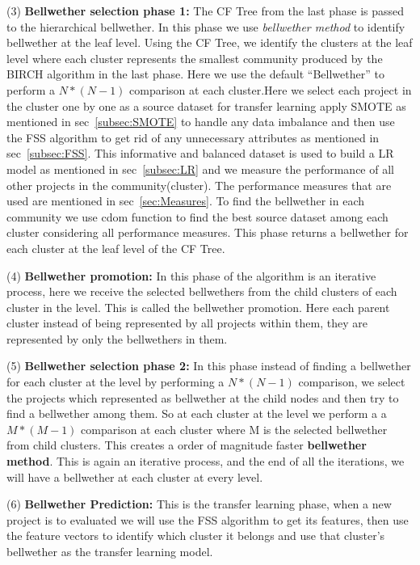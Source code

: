 \documentclass[sigconf,review]{acmart}
\theoremstyle{break}
\begin{document}
    (3) \textbf{Bellwether selection phase 1:} The CF Tree from the last phase is passed to the hierarchical bellwether. In this phase we use \textit{bellwether method} to identify bellwether at the leaf level. Using the CF Tree, we identify the clusters at the leaf level where each cluster represents the smallest community produced by the BIRCH algorithm in the last phase. Here we use the default ``Bellwether'' to perform a $ N*(N-1) $ comparison at each cluster.Here we select each project in the cluster one by one as a source dataset for transfer learning apply SMOTE as mentioned in sec~\ref{subsec:SMOTE} to handle any data imbalance and then use the FSS algorithm to get rid of any unnecessary attributes as mentioned in sec~\ref{subsec:FSS}. This informative and balanced dataset is used to build a LR model as mentioned in sec~\ref{subsec:LR} and we measure the performance of all other projects in the community(cluster). The performance measures that are used are mentioned in sec~\ref{sec:Measures}. To find the bellwether in each community we use cdom function to find the best source dataset among each cluster considering all performance measures. This phase returns a bellwether for each cluster at the leaf level of the CF Tree.
    
    (4) \textbf{Bellwether promotion:} In this phase of the algorithm is an iterative process, here we receive the selected bellwethers from the child clusters of each cluster in the level. This is called the bellwether promotion. Here each parent cluster instead of being represented by all projects within them, they are represented by only the bellwethers in them.  
    
    (5) \textbf{Bellwether selection phase 2:} In this phase instead of finding a bellwether for each cluster at the level by performing a $ N*(N-1) $ comparison, we select the projects which represented as bellwether at the child nodes and then try to find a bellwether among them. So at each cluster at the level we perform a a $ M*(M-1) $ comparison at each cluster where M is the selected bellwether from child clusters. This creates a order of magnitude faster \textbf{bellwether method}. This is again an iterative process, and the end of all the iterations, we will have a bellwether at each cluster at every level. 
    
    (6) \textbf{Bellwether Prediction:} This is the transfer learning phase, when a new project is to evaluated we will use the FSS algorithm to get its features, then use the feature vectors to identify which cluster it belongs and use that cluster's bellwether as the transfer learning model.
\end{document}
